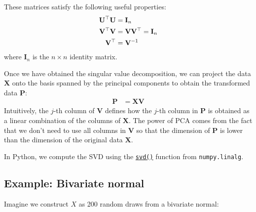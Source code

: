 \documentclass{scrartcl}
\begin{document}
These matrices satisfy the following useful properties: \[
\def\bV{\mathbf{V}}
\def\bU{\mathbf{U}}
\def\bI{\mathbf{I}}
\begin{aligned}
    \bU^\top \bU &= \bI_n \\
    \bV^\top \bV &= \bV\bV^\top = \bI_n \\
    \bV^\top &= \bV^{-1}
\end{aligned}
\] where \(\mathbf{I}_n\) is the \(n\times n\) identity matrix.

Once we have obtained the singular value decomposition, we can project
the data \(\mathbf{X}\) onto the basis spanned by the principal
components to obtain the transformed data \(\mathbf{P}\): \[
\begin{aligned}
    \mathbf{P} &= \mathbf{X} \mathbf{V}
\end{aligned}
\] Intuitively, the \(j\)-th column of \(\mathbf{V}\) defines how the
\(j\)-th column in \(\mathbf{P}\) is obtained as a linear combination of
the columns of \(\mathbf{X}\). The power of PCA comes from the fact that
we don't need to use all columns in \(\mathbf{V}\) so that the dimension
of \(\mathbf{P}\) is lower than the dimension of the original data
\(\mathbf{X}\).

In Python, we compute the SVD using the
\href{https://numpy.org/doc/stable/reference/generated/numpy.linalg.svd.html}{\texttt{svd()}}
function from \texttt{numpy.linalg}.

    \hypertarget{example-bivariate-normal}{%
\subsection{Example: Bivariate normal}\label{example-bivariate-normal}}

Imagine we construct \(X\) as 200 random draws from a bivariate normal:
\end{document}
